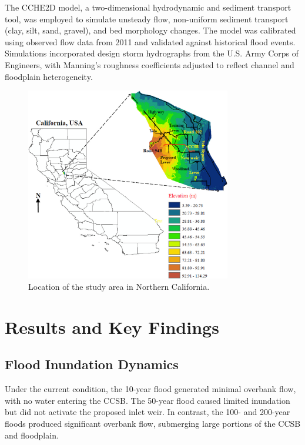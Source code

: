 \documentclass[a4paper, 11pt]{article}
\begin{document}
The CCHE2D model, a two-dimensional hydrodynamic and sediment transport tool, was employed to simulate unsteady flow, non-uniform sediment transport (clay, silt, sand, gravel), and bed morphology changes. The model was calibrated using observed flow data from 2011 and validated against historical flood events. Simulations incorporated design storm hydrographs from the U.S. Army Corps of Engineers, with Manning’s roughness coefficients adjusted to reflect channel and floodplain heterogeneity.

\begin{figure}[H]
    \centering
    \includegraphics[width=0.8\textwidth]{location.png}
    \caption{Location of the study area in Northern California.}
    \label{fig:location}
\end{figure}

\section{Results and Key Findings}

\subsection{Flood Inundation Dynamics}
\hspace*{0.5cm}Under the current condition, the 10-year flood generated minimal overbank flow, with no water entering the CCSB. The 50-year flood caused limited inundation but did not activate the proposed inlet weir. In contrast, the 100- and 200-year floods produced significant overbank flow, submerging large portions of the CCSB and floodplain.
\end{document}
